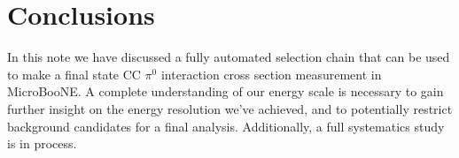 \documentclass[12pt]{article}
\begin{document}
%
%
%
%
%
%
%
%
%
\section{Conclusions}
\label{sec:conclusions}
\par In this note we have discussed a fully automated selection chain that can be used to make a final state CC $\pi^0$ interaction cross section measurement in MicroBooNE.  A complete understanding of our energy scale is necessary to gain further insight on the energy resolution we've achieved, and to potentially restrict background candidates for a final analysis. Additionally, a full systematics study is in process. 
\end{document}
